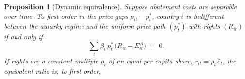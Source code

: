 \documentclass[12pt,english]{article}
\newtheorem{proposition}{Proposition}
\theoremstyle{remark}
\begin{document}
\begin{proposition}[Dynamic equivalence]\label{prop:dynamic}
Suppose abatement costs are separable over time. To first order in the price gaps $p_{it}-p^*_t$, country $i$ is indifferent between the autarky regime and the uniform price path $(p^*_t)$ with rights $(R_{it})$ if and only if
\begin{equation}
  \sum_t \beta_t\,p^*_t\,\bigl(R_{it}-E^A_{it}\bigr) \;=\; 0.
  \label{eq:dyn_equiv}
\end{equation}
If rights are a constant multiple $\rho_i$ of an equal per capita share, $r_{it}=\rho_i\,\bar e_t$, %
the equivalent ratio is, to first order,

\end{proposition}
\end{document}

